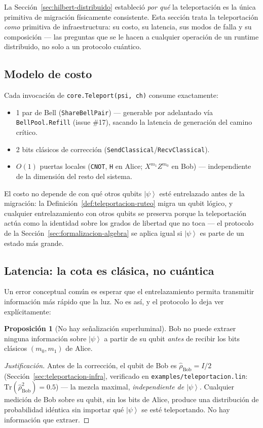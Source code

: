 \documentclass[12pt, a4paper, openany]{report}
\theoremstyle{definition}
\newtheorem{proposition}{Proposición}[chapter]
\newcommand{\ket}[1]{\left|#1\right\rangle}
\newcommand{\density}{\hat{\rho}}
\newcommand{\tr}{\mathrm{Tr}}
\begin{document}
La Sección~\ref{sec:hilbert-distribuido} estableció \emph{por qué} la teleportación es la única primitiva de migración físicamente consistente. Esta sección trata la teleportación \emph{como} primitiva de infraestructura: su costo, su latencia, sus modos de falla y su composición — las preguntas que se le hacen a cualquier operación de un runtime distribuido, no solo a un protocolo cuántico.

\subsection{Modelo de costo}

Cada invocación de \texttt{core.Teleport(psi, ch)} consume exactamente:

\begin{itemize}
  \item 1 par de Bell (\texttt{ShareBellPair}) — generable por adelantado vía \texttt{BellPool.Refill} (issue \#17), sacando la latencia de generación del camino crítico.
  \item 2 bits clásicos de corrección (\texttt{SendClassical}/\texttt{RecvClassical}).
  \item $O(1)$ puertas locales (\texttt{CNOT}, \texttt{H} en Alice; $X^{m_1}Z^{m_0}$ en Bob) — independiente de la dimensión del resto del sistema.
\end{itemize}

El costo no depende de con qué otros qubits $\ket{\psi}$ esté entrelazado antes de la migración: la Definición~\ref{def:teleportacion-ruteo} migra un qubit lógico, y cualquier entrelazamiento con otros qubits se preserva porque la teleportación actúa como la identidad sobre los grados de libertad que no toca — el protocolo de la Sección~\ref{sec:formalizacion-algebra} se aplica igual si $\ket{\psi}$ es parte de un estado más grande.

\subsection{Latencia: la cota es clásica, no cuántica}

Un error conceptual común es esperar que el entrelazamiento permita transmitir información más rápido que la luz. No es así, y el protocolo lo deja ver explícitamente:

\begin{proposition}[No hay señalización superluminal]
\label{prop:no-signaling}
Bob no puede extraer ninguna información sobre $\ket{\psi}$ a partir de su qubit \emph{antes} de recibir los bits clásicos $(m_0, m_1)$ de Alice.
\end{proposition}
\begin{proof}[Justificación]
Antes de la corrección, el qubit de Bob es $\density_{\text{Bob}} = I/2$ (Sección~\ref{sec:teleportacion-infra}, verificado en \texttt{examples/teleportacion.lin}: $\tr(\density_{\text{Bob}}^2) = 0.5$) — la mezcla maximal, \emph{independiente de $\ket{\psi}$}. Cualquier medición de Bob sobre su qubit, sin los bits de Alice, produce una distribución de probabilidad idéntica sin importar qué $\ket{\psi}$ se esté teleportando. No hay información que extraer.
\end{proof}
\end{document}
